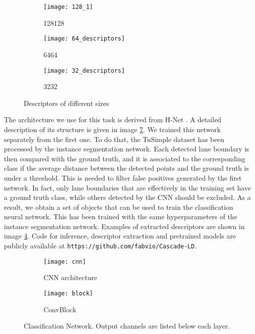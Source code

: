 \documentclass[runningheads]{llncs}
\begin{document}
\begin{figure}[h]
\hfill
\centering
\begin{subfigure}{.33\linewidth}
	\centering

  \texttt{[image: 128\_1]}
  \caption{128128}
  \label{fig:sub1}
\end{subfigure}\hfill
\begin{subfigure}{.33\linewidth}
\centering

  \texttt{[image: 64\_descriptors]}
  \caption{6464}
  \label{fig:sub2}
\end{subfigure}
\hfill
\begin{subfigure}{.33\linewidth}
\centering

  \texttt{[image: 32\_descriptors]}
  \caption{3232}
  \label{fig:sub2}
\end{subfigure}
\hfill

\caption{Descriptors of different sizes}
\label{fig:descriptors}

\end{figure}

The architecture we use for this task is derived from H-Net \cite{neven2018towards}. A detailed description of its structure is given in image \ref{fig:hnet}. We trained this network separately from the first one. To do that, the TuSimple dataset has been processed by the instance segmentation network. Each detected lane boundary is then compared with the ground truth, and it is associated to the corresponding class if the average distance between the detected points and the ground truth is under a threshold. This is needed to filter false positives generated by the first network. In fact, only lane boundaries that are effectively in the training set have a ground truth class, while others detected by the CNN should be excluded. As a result, we obtain a set of  objects that can be used to train the classification neural network. This has been trained with the same hyperparameters of the instance segmentation network. Examples of extracted descriptors are shown in image \ref{fig:descriptors}. Code for inference, descriptor extraction and pretrained models are publicly available at \texttt{https://github.com/fabvio/Cascade-LD}.
\begin{figure}[hbt!]
\hfill
\centering
\begin{subfigure}{.7\linewidth}
	\centering

  \texttt{[image: cnn]}
  \caption{CNN architecture}
  \label{fig:sub1}
\end{subfigure}\hfill
\hfill
\begin{subfigure}{.3\linewidth}
\centering

  \texttt{[image: block]}
  \caption{ConvBlock}
  \label{fig:sub2}
\end{subfigure}
\hfill

\caption{Classification Network. Output channels are listed below each layer.}
\label{fig:hnet}

\end{figure}
\end{document}
